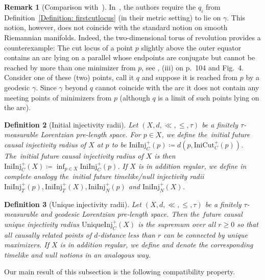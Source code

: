 \documentclass[a4paper,11pt]{article}
\numberwithin{equation}{section}
\theoremstyle{plain}
\newtheorem{Definition}{Definition}[section]
\theoremstyle{definition}
\newtheorem{Remark}[Definition]{Remark}
\begin{document}
\begin{Remark}[Comparison with~\cite{shankar2009conjugate}]
In~\cite[Def.\ 7.2]{shankar2009conjugate}, the authors require the $q_i$ from Definition~\ref{Definition: firstcutlocus} (in their metric setting) to lie on $\gamma$. 
This notion, however, does not coincide with the standard notion on smooth Riemannian manifolds.
Indeed, the two-dimensional torus of revolution provides a counterexample: The cut locus of a point $p$ slightly above the outer equator contains an arc lying on a parallel whose endpoints are conjugate but cannot be reached by more than one minimizer from $p$, see \cite{GMST:05}, (iii) on p.\ 104 and Fig.\ 4. Consider one of these (two) points, call it $q$ and suppose it is reached from $p$ by a geodesic $\gamma$. Since $\gamma$ beyond $q$ cannot coincide with the arc it does not contain any meeting points of minimizers from $p$ (although $q$ is a limit of such points lying on the arc).
\end{Remark}

\begin{Definition}[Initial injectivity radii]
Let $(X,d,\ll,\leq,\tau)$ be a finitely $\tau$-measurable Lorentzian pre-length space. For $p \in X$, we define the~\emph{initial future causal injectivity radius} of $X$ at $p$ to be $\mathrm{IniInj}_C^+(p) \coloneqq d(p,\mathrm{IniCut}_C^+(p))$. The~\emph{initial future causal injectivity radius} of $X$ is then $\mathrm{IniInj}_C^+(X) \coloneqq \inf_{p \in X} \mathrm{IniInj}_C^+(p)$. If $X$ is in addition regular, we define in complete analogy the~\emph{initial future timelike/null injectivity radii} $\mathrm{IniInj}_T^+(p),\mathrm{IniInj}_T^+(X), \mathrm{IniInj}_N^+(p)$ and $\mathrm{IniInj}_N^+(X)$.
\end{Definition}

\begin{Definition}[Unique injectivity radii]
Let $(X,d,\ll,\leq,\tau)$ be a finitely $\tau$-measurable and geodesic Lorentzian pre-length space. Then the~\emph{future causal unique injectivity radius} $\mathrm{UniqueInj}_C^+(X)$ is the supremum over all $r \geq 0$ so that all causally related points of $d$-distance less than $r$ can be connected by unique maximizers. If $X$ is in addition regular, we define and denote the corresponding timelike and null notions in an analogous way.
\end{Definition}

Our main result of this subsection is the following compatibility property.
\end{document}
